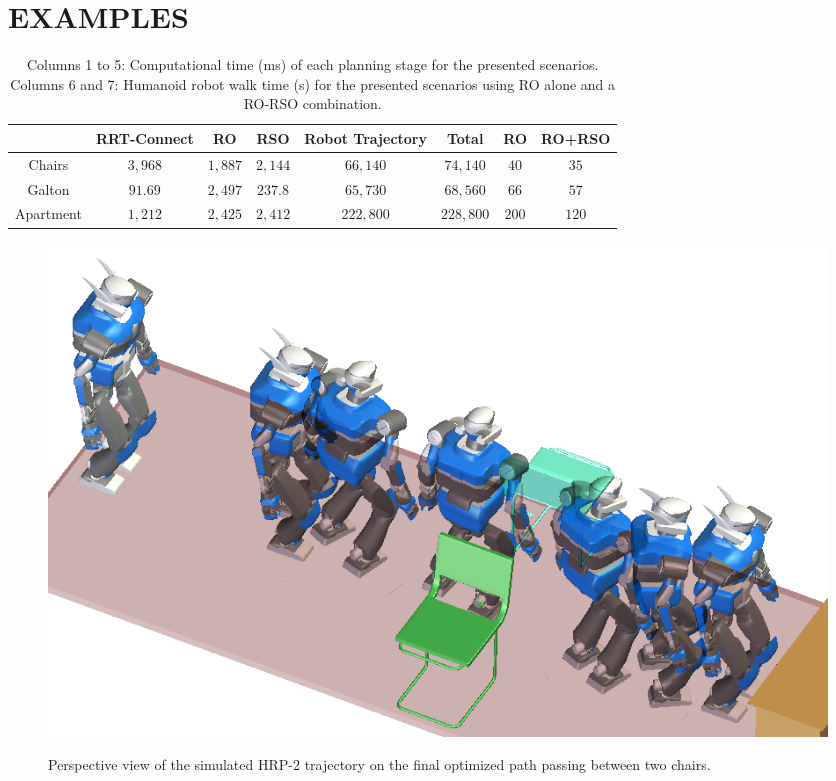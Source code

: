 \section{\uppercase{Examples}}
\label{examples}

\begin{table}[t]
\caption{Columns 1 to 5: Computational time (ms) of each planning stage
  for the presented scenarios. Columns 6 and 7: Humanoid robot walk
  time (s) for the presented scenarios using RO alone and a RO-RSO
  combination.}
\label{tab:computation-time}
\centering
\begin{tabular}{c|c|c|c|c|c||c|c|}
  \cline{2-8}
  & RRT-Connect & RO & RSO & Robot Trajectory & Total & RO & RO+RSO\\
  \hline
  \multicolumn{1}{|c|}{Chairs} & $3,968$ & $1,887$ & $2,144$ & $66,140$ & $74,140$ & $40$ & $35$\\
  \hline
  \multicolumn{1}{|c|}{Galton} & $91.69$ & $2,497$ & $237.8$ & $65,730$ & $68,560$ & $66$ & $57$\\
  \hline
  \multicolumn{1}{|c|}{Apartment} & $1,212$ & $2,425$ & $2,412$ & $222,800$ & $228,800$  & $200$ & $120$\\
  \hline
\end{tabular}
\vspace{-0.3cm}
\end{table}

\begin{figure}
  \centering
      {\includegraphics[width = \linewidth]{src/chap1-path-optimization/chairs-hash-optim-perspective-hrp2.png}}
      \caption{Perspective view of the simulated HRP-2 trajectory on
        the final optimized path passing between two chairs.}
      \label{fig:chairs-hash-optim-perspective-hrp2}
\end{figure}

